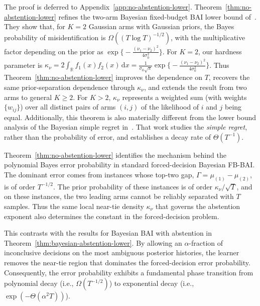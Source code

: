 \documentclass[10pt]{article}
\newcommand{\dd}{\mathrm{d}}
\theoremstyle{plain}
\begin{document}
The proof is deferred to Appendix~\ref{app:no-abstention-lower}.
Theorem~\ref{thm:no-abstention-lower} refines the two-arm Bayesian
fixed-budget BAI lower bound of~\citet{atsidakou2023bayesian}. They show that,
for \(K=2\) Gaussian arms with Gaussian priors, the Bayes probability of
misidentification is \( \Omega((T\log T)^{-1/2})\), with the multiplicative factor depending on the  prior as $\exp\big\{\!-\!\frac{(\nu_1-\nu_2)^2}{4\sigma_0^2} \big\}$.
For \(K=2\), our hardness parameter is
    $\kappa_\nu
    =
    2\int_{\mathbb R}f_1(x)f_2(x)\,\dd x
    =
    \frac{1}{\sigma_0\sqrt{\pi}}
    \exp \big\{
        \!-\!\frac{(\nu_1-\nu_2)^2}{4\sigma_0^2}
    \big\}$.
Thus Theorem~\ref{thm:no-abstention-lower} improves the dependence on $T$, recovers the same prior-separation
dependence through $\kappa_\nu$, and extends the
result from two arms to general \(K\ge 2\).
For \(K>2\), \(\kappa_\nu\) represents a weighted sum (with weights $\{w_{ij}\}$) over all distinct pairs of arms $(i,j)$ of the likelihood of $i$ and $j$ being equal. 
Additionally, this theorem is also materially different from the lower bound analysis of the Bayesian simple regret in~\citet{komiyama2024rate}.
 That work studies the \emph{simple regret}, rather than the probability of error, and establishes a decay rate of $\Theta(T^{-1})$.
 

Theorem~\ref{thm:no-abstention-lower} identifies the mechanism behind the
polynomial Bayes error probability in standard forced-decision Bayesian FB-BAI. The dominant error comes
from instances whose top-two gap, $\Gamma=\mu_{(1)}-\mu_{(2)}$, is of order \(T^{-1/2}\). The prior probability of these instances is of order \(\kappa_\nu/\sqrt T\), and on these instances, the two leading arms cannot be reliably separated with $T$ samples. Thus the same local near-tie density \(\kappa_\nu\) that governs
the abstention exponent  also determines the constant   in
the forced-decision problem.

This contrasts with the results for Bayesian BAI with abstention in Theorem~\ref{thm:bayesian-abstention-lower}. By allowing an \(\alpha\)-fraction of inconclusive decisions on the most ambiguous posterior
histories, the learner removes the near-tie region that dominates the
forced-decision error probability. 
Consequently, the error probability exhibits a fundamental phase transition from 
polynomial decay (i.e., $\Omega(T^{-1/2})$)
to exponential decay (i.e., $\exp( - \Theta( \alpha^2T) )$).
\end{document}
